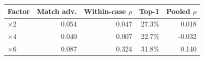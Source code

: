 \begin{tabular}{lrrrr}
\toprule
Factor & Match adv. & Within-case $\rho$ & Top-1 & Pooled $\rho$ \\
\midrule
$\times$2 & 0.054 & 0.047 & 27.3\% & 0.018 \\
$\times$4 & 0.040 & 0.007 & 22.7\% & -0.032 \\
$\times$6 & 0.087 & 0.324 & 31.8\% & 0.140 \\
\bottomrule
\end{tabular}
